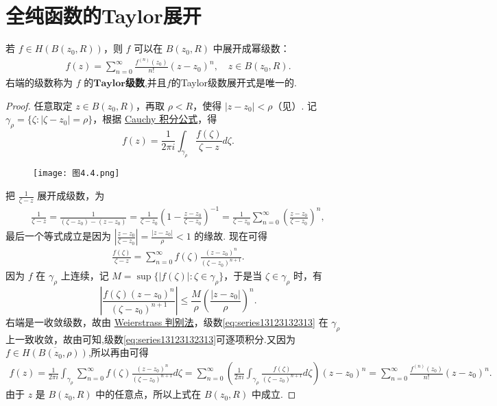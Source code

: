 \documentclass[../../main.tex]{subfiles}
\begin{document}
\section{全纯函数的Taylor展开}

\begin{theorem}\label{theorem:定理4.3.1}
若 \( f \in H(B(z_0,R)) \)，则 \( f \) 可以在 \( B(z_0,R) \) 中展开成幂级数：
\begin{align}
f(z) = \sum_{n=0}^{\infty} \frac{f^{(n)}(z_0)}{n!} (z - z_0)^n, \quad z \in B(z_0,R). \label{eq:taylor312412342}
\end{align}
右端的级数称为 \( f \) 的$\mathbf{Taylor}$\textbf{级数},并且$f$的Taylor级数展开式是唯一的.
\end{theorem}
\begin{proof}
任意取定 \( z \in B(z_0,R) \)，再取 \( \rho < R \)，使得 \( |z - z_0| < \rho \)（见）. 记 \( \gamma_{\rho} = \{ \zeta : |\zeta - z_0| = \rho \} \)，根据 \hyperref[theorem:定理3.4.1]{Cauchy 积分公式}，得
\[
f(z) = \frac{1}{2\pi i} \int_{\gamma_{\rho}} \frac{f(\zeta)}{\zeta - z} d\zeta.
\]
\begin{figure}[H]
\centering
\texttt{[image: 图4.4.png]}
\caption{}
\label{figure:图4.4}
\end{figure}
把 \( \frac{1}{\zeta - z} \) 展开成级数，为
\begin{align*}
\frac{1}{\zeta - z} = \frac{1}{(\zeta - z_0) - (z - z_0)} = \frac{1}{\zeta - z_0} \left( 1 - \frac{z - z_0}{\zeta - z_0} \right)^{-1} = \frac{1}{\zeta - z_0} \sum_{n=0}^{\infty} \left( \frac{z - z_0}{\zeta - z_0} \right)^n,
\end{align*}
最后一个等式成立是因为 \( \left| \frac{z - z_0}{\zeta - z_0} \right| = \frac{|z - z_0|}{\rho} < 1 \) 的缘故. 现在可得
\begin{align}
\frac{f(\zeta)}{\zeta - z} = \sum_{n=0}^{\infty} f(\zeta) \frac{(z - z_0)^n}{(\zeta - z_0)^{n+1}}. \label{eq:series13123132313}
\end{align}
因为 \( f \) 在 \( \gamma_{\rho} \) 上连续，记 \( M = \sup \{ |f(\zeta)| : \zeta \in \gamma_{\rho} \} \)，于是当 \( \zeta \in \gamma_{\rho} \) 时，有
\[
\left| \frac{f(\zeta)(z - z_0)^n}{(\zeta - z_0)^{n+1}} \right| \leq \frac{M}{\rho} \left( \frac{|z - z_0|}{\rho} \right)^n.
\]
右端是一收敛级数，故由 \hyperref[theorem:Weierstrass一致收敛判别法]{Weierstrass 判别法}，级数\eqref{eq:series13123132313} 在 \( \gamma_{\rho} \) 上一致收敛，故由可知,级数\eqref{eq:series13123132313}可逐项积分.又因为$f\in \overline{H(B(z_0,\rho))}$,所以再由可得
\begin{align*}
f(z) = \frac{1}{2\pi i} \int_{\gamma_{\rho}} \sum_{n=0}^{\infty} f(\zeta) \frac{(z - z_0)^n}{(\zeta - z_0)^{n+1}} d\zeta = \sum_{n=0}^{\infty} \left( \frac{1}{2\pi i} \int_{\gamma_{\rho}} \frac{f(\zeta)}{(\zeta - z_0)^{n+1}} d\zeta \right) (z - z_0)^n = \sum_{n=0}^{\infty} \frac{f^{(n)}(z_0)}{n!} (z - z_0)^n.
\end{align*}
由于 \( z \) 是 \( B(z_0,R) \) 中的任意点，所以上式在 \( B(z_0,R) \) 中成立. 


\end{proof}
\end{document}
